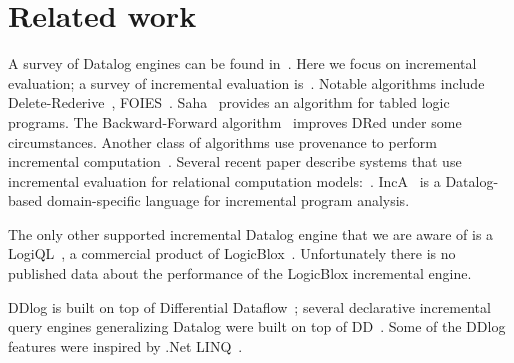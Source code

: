 \section{Related work}

A survey of Datalog engines can be found in~\cite{Maier-book18}.  Here
we focus on incremental evaluation; a survey of incremental evaluation
is~\cite{gupta-deb95}.  Notable algorithms include
Delete-Rederive~\cite{Gupta-sigmod93}, FOIES~\cite{dong-dbpl94}.
Saha~\cite{saha-iclp03} provides an algorithm for tabled logic
programs.  The Backward-Forward algorithm~\cite{motik-aaai15} improves
DRed under some circumstances.  Another class of algorithms use
provenance to perform incremental computation~\cite{liu-icde09}.
Several recent paper describe systems that use incremental evaluation
for relational computation models:~\cite{ahmad-vldb12,zhao-icmd17}.
IncA~\cite{IncA,Szabo-ase016} is a Datalog-based domain-specific
language for incremental program analysis.

The only other supported incremental Datalog engine that we are aware
of is a LogiQL~\cite{Green-pods15}, a commercial product of
LogicBlox~\cite{Aref-sigmod15}.  Unfortunately there is no published
data about the performance of the LogicBlox incremental engine.

DDlog is built on top of Differential
Dataflow~\cite{differential-dataflow}; several declarative incremental
query engines generalizing Datalog were built on top of
DD~\cite{timely-dataflow,differential-dataflow-paper}.  Some of the
DDlog features were inspired by .Net LINQ~\cite{meijer-dpcool03}.
